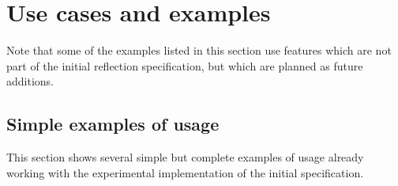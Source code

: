\section{Use cases and examples}
\label{use-cases-examples}

Note that some of the examples listed in this section use features which
are not part of the initial reflection specification, but which are planned
as future additions.









\subsection{Simple examples of usage}

This section shows several simple but complete examples of usage already working
with the experimental implementation of the initial specification.









